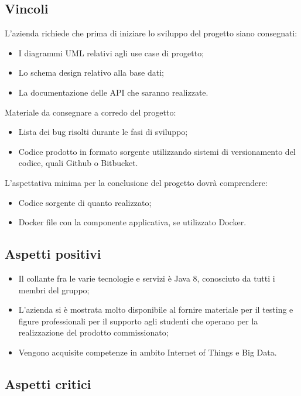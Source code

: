 \subsection{Vincoli}
L'azienda richiede che prima di iniziare lo sviluppo del progetto siano consegnati:
\begin{itemize}
\item I diagrammi UML relativi agli use case di progetto;
\item Lo schema design relativo alla base dati;
\item La documentazione delle API che saranno realizzate. 
\end{itemize}
Materiale da consegnare a corredo del progetto: 
\begin{itemize}
\item Lista dei bug risolti durante le fasi di sviluppo;
\item Codice prodotto in formato sorgente utilizzando sistemi di versionamento del codice, quali Github o Bitbucket.
\end{itemize}
L'aspettativa minima per la conclusione del progetto dovr\`a comprendere: 
\begin{itemize}
\item Codice sorgente di quanto realizzato;
\item Docker file con la componente applicativa, se utilizzato Docker.
\end{itemize}

\subsection{Aspetti positivi}
\begin{itemize}
\item Il collante fra le varie tecnologie e servizi \`e Java 8, conosciuto da tutti i membri del gruppo;
\item L'azienda si \`e mostrata molto disponibile al fornire materiale per il testing e figure professionali per il supporto agli studenti che operano per la realizzazione del prodotto commissionato;
\item Vengono acquisite competenze in ambito Internet of Things e Big Data.
\end{itemize}

\subsection{Aspetti critici}

